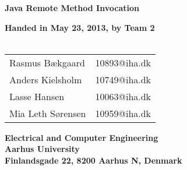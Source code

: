 \documentclass[a4paper,10pt]{report}
\begin{document}
\begin{titlepage}
\begin{center}
{\LARGE \textbf{Java Remote Method Invocation}}


\vspace{4cm}
\textbf{Handed in May 23, 2013, by Team 2}\\~\\
\begin{tabular}{ll}
Rasmus Bækgaard  & 10893@iha.dk \\
Anders Kielsholm  & 10749@iha.dk \\
Lasse Hansen  & 10063@iha.dk \\
Mia Leth Sørensen & 10959@iha.dk \\
\end{tabular}
\vfill
\textbf{Electrical and Computer Engineering}\\
\textbf{Aarhus University}\\
\textbf{Finlandsgade 22, 8200 Aarhus N, Denmark}
\end{center}
\end{titlepage}















\end{document}
